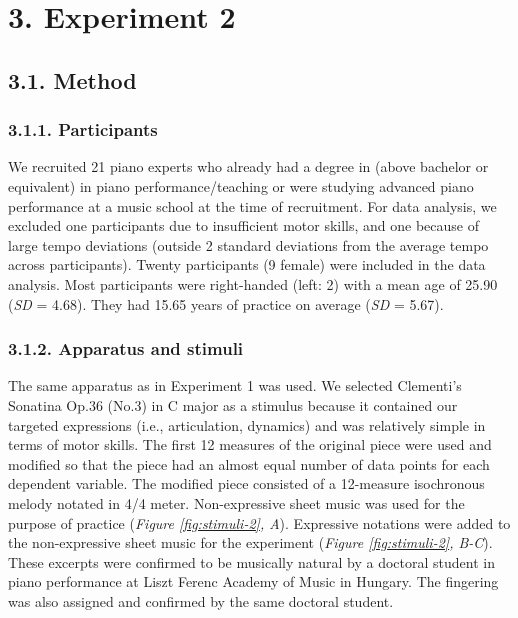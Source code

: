 \documentclass[
  english,
  man,floatsintext]{apa6}
\begin{document}
\newpage

\hypertarget{experiment-2}{%
\section{3. Experiment 2}\label{experiment-2}}

\hypertarget{method-1}{%
\subsection{3.1. Method}\label{method-1}}

\hypertarget{participants-1}{%
\subsubsection{3.1.1. Participants}\label{participants-1}}

We recruited 21 piano experts who already had a degree in (above bachelor or equivalent) in piano performance/teaching or were studying advanced piano performance at a music school at the time of recruitment. For data analysis, we excluded one participants due to insufficient motor skills, and one because of large tempo deviations (outside 2 standard deviations from the average tempo across participants). Twenty participants (9 female) were included in the data analysis. Most participants were right-handed (left: 2) with a mean age of 25.90 (\emph{SD} = 4.68). They had 15.65 years of practice on average (\emph{SD} = 5.67).

\hypertarget{apparatus-and-stimuli-1}{%
\subsubsection{3.1.2. Apparatus and stimuli}\label{apparatus-and-stimuli-1}}

The same apparatus as in Experiment 1 was used. We selected Clementi's Sonatina Op.36 (No.3) in C major as a stimulus because it contained our targeted expressions (i.e., articulation, dynamics) and was relatively simple in terms of motor skills. The first 12 measures of the original piece were used and modified so that the piece had an almost equal number of data points for each dependent variable. The modified piece consisted of a 12-measure isochronous melody notated in 4/4 meter. Non-expressive sheet music was used for the purpose of practice (\emph{Figure \ref{fig:stimuli-2}, A}). Expressive notations were added to the non-expressive sheet music for the experiment (\emph{Figure \ref{fig:stimuli-2}, B-C}). These excerpts were confirmed to be musically natural by a doctoral student in piano performance at Liszt Ferenc Academy of Music in Hungary. The fingering was also assigned and confirmed by the same doctoral student.
\end{document}
